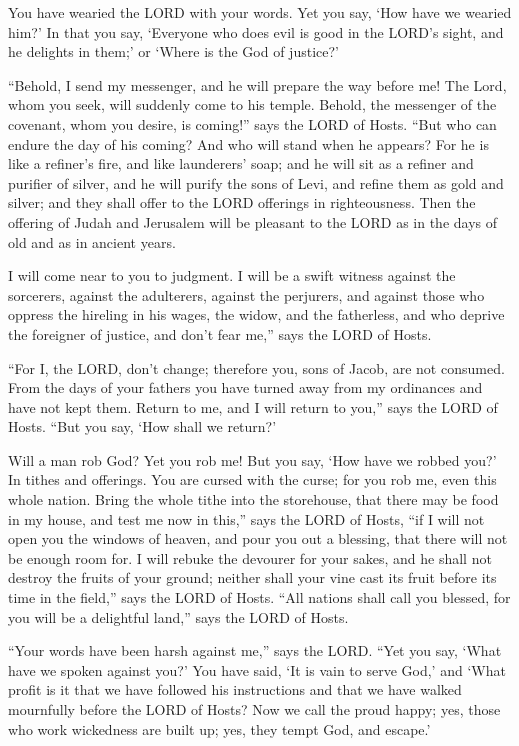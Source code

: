 \myverse{}You have wearied the LORD with your words. Yet you say, ‘How have we wearied him?’ In that you say, ‘Everyone who does evil is good in the LORD’s sight, and he delights in them;’ or ‘Where is the God of justice?’


\mychapter{} \myverse*{}“Behold, I send my messenger, and he will prepare the way before me! The Lord, whom you seek, will suddenly come to his temple. Behold, the messenger of the covenant, whom you desire, is coming!” says the LORD of Hosts. \myverse{}“But who can endure the day of his coming? And who will stand when he appears? For he is like a refiner’s fire, and like launderers’ soap; \myverse{}and he will sit as a refiner and purifier of silver, and he will purify the sons of Levi, and refine them as gold and silver; and they shall offer to the LORD offerings in righteousness. \myverse{}Then the offering of Judah and Jerusalem will be pleasant to the LORD as in the days of old and as in ancient years.


\myverse{}I will come near to you to judgment. I will be a swift witness against the sorcerers, against the adulterers, against the perjurers, and against those who oppress the hireling in his wages, the widow, and the fatherless, and who deprive the foreigner of justice, and don’t fear me,” says the LORD of Hosts.


\myverse{}“For I, the LORD, don’t change; therefore you, sons of Jacob, are not consumed. \myverse{}From the days of your fathers you have turned away from my ordinances and have not kept them. Return to me, and I will return to you,” says the LORD of Hosts. “But you say, ‘How shall we return?’


\myverse{}Will a man rob God? Yet you rob me! But you say, ‘How have we robbed you?’ In tithes and offerings. \myverse{}You are cursed with the curse; for you rob me, even this whole nation. \myverse{}Bring the whole tithe into the storehouse, that there may be food in my house, and test me now in this,” says the LORD of Hosts, “if I will not open you the windows of heaven, and pour you out a blessing, that there will not be enough room for. \myverse{}I will rebuke the devourer for your sakes, and he shall not destroy the fruits of your ground; neither shall your vine cast its fruit before its time in the field,” says the LORD of Hosts. \myverse{}“All nations shall call you blessed, for you will be a delightful land,” says the LORD of Hosts.


\myverse{}“Your words have been harsh against me,” says the LORD. “Yet you say, ‘What have we spoken against you?’ \myverse{}You have said, ‘It is vain to serve God,’ and ‘What profit is it that we have followed his instructions and that we have walked mournfully before the LORD of Hosts? \myverse{}Now we call the proud happy; yes, those who work wickedness are built up; yes, they tempt God, and escape.’



